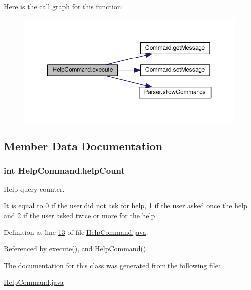 Here is the call graph for this function\-:
\nopagebreak
\begin{figure}[H]
\begin{center}
\leavevmode
\includegraphics[width=350pt]{classHelpCommand_ac93c4d17e1bed11f86d0f3c21ba00e34_cgraph}
\end{center}
\end{figure}




\subsection{Member Data Documentation}
\hypertarget{classHelpCommand_a43be62a6791ea374e55433d33447124d}{
\subsubsection[{help\-Count}]{\setlength{\rightskip}{0pt plus 5cm}int Help\-Command.\-help\-Count\hspace{0.3cm}{\ttfamily [private]}}}\label{classHelpCommand_a43be62a6791ea374e55433d33447124d}


Help query counter. 

It is equal to 0 if the user did not ask for help, 1 if the user asked once the help and 2 if the user asked twice or more for the help 

Definition at line \hyperlink{HelpCommand_8java_source_l00013}{13} of file \hyperlink{HelpCommand_8java_source}{Help\-Command.\-java}.



Referenced by \hyperlink{HelpCommand_8java_source_l00028}{execute()}, and \hyperlink{HelpCommand_8java_source_l00018}{Help\-Command()}.



The documentation for this class was generated from the following file\-:\begin{DoxyCompactItemize}
\item 
\hyperlink{HelpCommand_8java}{Help\-Command.\-java}\end{DoxyCompactItemize}
